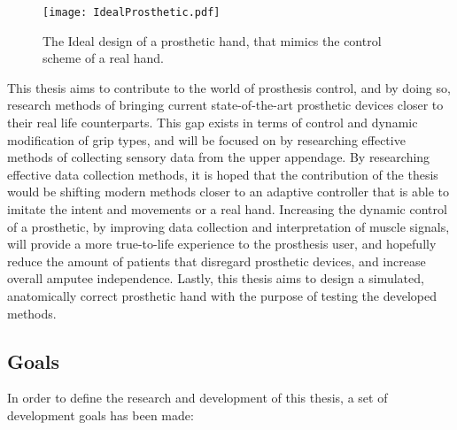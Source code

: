 \documentclass[../main.tex]{subfiles}
\begin{document}
\begin{figure}[h]
\begin{center}
\texttt{[image: IdealProsthetic.pdf]}
\caption{The Ideal design of a prosthetic hand, that mimics the control scheme of a real hand.}
\label{fig:idealprosthetic}
\end{center}
\end{figure}

This thesis aims to contribute to the world of prosthesis control, and by doing so, research methods of bringing current state-of-the-art prosthetic devices closer to their real life counterparts.
This gap exists in terms of control and dynamic modification of grip types, and will be focused on by researching effective methods of collecting sensory data from the upper appendage.
By researching effective data collection methods, it is hoped that the contribution of the thesis would be shifting modern methods closer to an adaptive controller that is able to imitate the intent and movements or a real hand.
Increasing the dynamic control of a prosthetic, by improving data collection and interpretation of  muscle signals, will provide a more true-to-life experience to the prosthesis user, and hopefully reduce the amount of patients that disregard prosthetic devices, and increase overall amputee independence.
Lastly, this thesis aims to design a simulated, anatomically correct prosthetic hand with the purpose of testing the developed methods.


\newpage
\subsection{Goals}
\label{sec:goals}

In order to define the research and development of this thesis, a set of development goals has been made:
\end{document}
